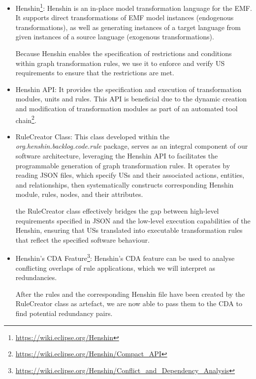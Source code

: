 \begin{itemize}
	\item Henshin\footnote{\href{https://wiki.eclipse.org/Henshin}{https://wiki.eclipse.org/Henshin}}: Henshin is an in-place model transformation language for the EMF. It supports direct transformations of EMF model instances (endogenous transformations), as well as generating instances of a target language from given instances of a source language (exogenous transformations).
	
	Because Henshin enables the specification of restrictions and conditions within graph transformation rules, we use it to enforce and verify US requirements to ensure that the restrictions are met.
		
	\item Henshin API: It provides the specification and execution of transformation modules, units and rules. This API is beneficial due to the dynamic creation and modification of transformation modules as part of an automated tool chain\footnote{\href{https://wiki.eclipse.org/Henshin/Compact\_API}{https://wiki.eclipse.org/Henshin/Compact\_API}}.
	
	\item RuleCreator Class: This class developed within the \textit{org.henshin.backlog.code.rule} package, serves as an integral component of our software architecture, leveraging the Henshin API to facilitates the programmable generation of graph transformation rules. It operates by reading JSON files, which specify USs and their associated actions, entities, and relationships, then systematically constructs corresponding Henshin module, rules, nodes, and their attributes.
	
	the RuleCreator class effectively bridges the gap between high-level requirements specified in JSON and the low-level execution capabilities of the Henshin, ensuring that USs translated into executable transformation rules that reflect the specified software behaviour. %
	
	\item Henshin's CDA Feature\footnote{\href{https://wiki.eclipse.org/Henshin/Conflict\_and\_Dependency\_Analysis}{https://wiki.eclipse.org/Henshin/Conflict\_and\_Dependency\_Analysis}}: Henshin's CDA feature can be used to analyse conflicting overlaps of rule applications,	which we will interpret as redundancies.
	
	After the rules and the corresponding Henshin file have been created by the RuleCreator class as artefact, we are now able to pass them to the CDA to find potential redundancy pairs.
	

\end{itemize}
